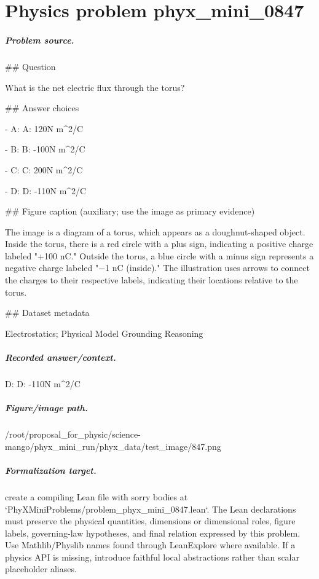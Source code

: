 
\chapter{Physics problem phyx\_mini\_0847}
\label{ch:PhyXMiniProblems_problem_phyx_mini_0847}

\paragraph{Problem source.}
\#\# Question

What is the net electric flux through the torus?

\#\# Answer choices

- A: A: 120N m\textasciicircum{}2/C

- B: B: -100N m\textasciicircum{}2/C

- C: C: 200N m\textasciicircum{}2/C

- D: D: -110N m\textasciicircum{}2/C

\#\# Figure caption (auxiliary; use the image as primary evidence)

The image is a diagram of a torus, which appears as a doughnut-shaped object. Inside the torus, there is a red circle with a plus sign, indicating a positive charge labeled "+100 nC." Outside the torus, a blue circle with a minus sign represents a negative charge labeled "−1 nC (inside)." The illustration uses arrows to connect the charges to their respective labels, indicating their locations relative to the torus.

\#\# Dataset metadata

Electrostatics; Physical Model Grounding Reasoning

\paragraph{Recorded answer/context.}
D: D: -110N m\textasciicircum{}2/C

\paragraph{Figure/image path.}
/root/proposal\_for\_physic/science-mango/phyx\_mini\_run/phyx\_data/test\_image/847.png

\paragraph{Formalization target.}
create a compiling Lean file with sorry bodies at `PhyXMiniProblems/problem\_phyx\_mini\_0847.lean`. The Lean declarations must preserve the physical quantities, dimensions or dimensional roles, figure labels, governing-law hypotheses, and final relation expressed by this problem.
Use Mathlib/Physlib names found through LeanExplore where available. If a physics API is missing, introduce faithful local abstractions rather than scalar placeholder aliases.

